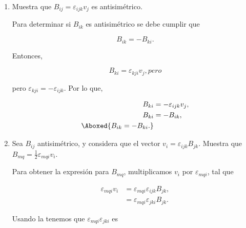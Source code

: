 \documentclass[../main.tex]{subfiles}
\begin{document}
\begin{problema}
\begin{enumerate}
		      Renombrando índices \(m = i, n = j\),

		      \begin{empheq}[box=\mainresult]{equation}
			      \varepsilon_{ijk}\varepsilon_{pqk}  = \delta_{ip}\delta_{jq} - \delta_{iq}\delta_{jp}.
			      \label{eq:epsilon-delta}
		      \end{empheq}

		\item Muestra que \(B_{ij} = \varepsilon_{ijk}v_{j}\) es antisimétrico.

		      \startsolution

		      Para determinar si \(B_{ik}\) es antisimétrico se debe cumplir que

		      \begin{equation*}
			      B_{ik} = - B_{ki}.
		      \end{equation*}

		      Entonces,

		      \begin{equation*}
			      B_{ki} = \varepsilon_{kji}v_{j}, pero
		      \end{equation*}

		      pero \(\varepsilon_{kji} = - \varepsilon_{ijk}\). Por lo que,

		      \begin{align*}
			      B_{ki} & = - \varepsilon_{ijk}v_{j}, \\
			      B_{ki} & = - B_{ik},                 \\
			      \Aboxed{B_{ik} = - B_{ki}.}
		      \end{align*}
		\item Sea \(B_{ij}\) antisimétrico, y considera que el vector \(v_{i} = \varepsilon_{ijk}B_{jk}\). Muestra que \(B_{mq} = \tfrac{1}{2}\varepsilon_{mqi}v_{i}\).

		      \startsolution

		      Para obtener la expresión para \(B_{mq}\), multiplicamos \(v_{i}\) por \(\varepsilon_{mqi}\), tal que

		      \begin{align*}
			      \varepsilon_{mqi}v_{i} & = \varepsilon_{mqi}\varepsilon_{ijk}B_{jk}, \\
			                             & = \varepsilon_{mqi}\varepsilon_{jki}B_{jk}.
		      \end{align*}

		      Usando la  tenemos que \(\varepsilon_{mqi}\varepsilon_{jki}\) es


\end{enumerate}
\end{problema}
\end{document}

